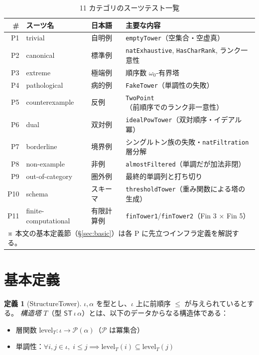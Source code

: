 \documentclass[a4paper,11pt]{ltjsarticle}
\theoremstyle{definition}
\newtheorem{definition}{定義}[section]
\theoremstyle{plain}
\theoremstyle{remark}
\newcommand{\ST}{\mathsf{ST}}    %
\newcommand{\lev}{\mathrm{level}}
\begin{document}
\begin{table}[H]
\centering
\caption{11 カテゴリのスーツテスト一覧}\label{tab:suit-categories}
\begin{tabular}{rlll}
\toprule
\# & スーツ名 & 日本語 & 主要な内容 \\
\midrule
P1  & trivial              & 自明例     & \texttt{emptyTower}（空集合・空虚真） \\
P2  & canonical            & 標準例     & \texttt{natExhaustive}, \texttt{HasCharRank}, ランク一意性 \\
P3  & extreme              & 極端例     & 順序数 $\omega_0$-有界塔 \\
P4  & pathological         & 病的例     & \texttt{FakeTower}（単調性の失敗） \\
P5  & counterexample       & 反例       & \texttt{TwoPoint}（前順序でのランク非一意性） \\
P6  & dual                 & 双対例     & \texttt{idealPowTower}（双対順序・イデアル冪） \\
P7  & borderline           & 境界例     & シングルトン族の失敗・\texttt{natFiltration} 層分解 \\
P8  & non-example          & 非例       & \texttt{almostFiltered}（単調だが加法非閉） \\
P9  & out-of-category      & 圏外例     & 最終的単調列と打ち切り \\
P10 & schema               & スキーマ   & \texttt{thresholdTower}（重み関数による塔の生成） \\
P11 & finite-computational & 有限計算例 & \texttt{finTower1}/\texttt{finTower2}（Fin 3 × Fin 5） \\
\bottomrule
\multicolumn{4}{l}{\small ※ 本文の基本定義節（§\ref{sec:basic}）は各 P に先立つインフラ定義を解説する。}
\end{tabular}
\end{table}

\section{基本定義}\label{sec:defs}

\begin{definition}[StructureTower]\label{def:structure-tower}
$\iota, \alpha$ を型とし、$\iota$ 上に前順序 $\leq$ が与えられているとする。
\emph{構造塔} $T$（型 $\ST\,\iota\,\alpha$）とは、以下のデータからなる構造体である：
\begin{itemize}
  \item 層関数 $\lev_T : \iota \to \mathcal{P}(\alpha)$（$\mathcal{P}$ は冪集合）
  \item 単調性：$\forall i, j \in \iota,\; i \leq j \implies \lev_T(i) \subseteq \lev_T(j)$
\end{itemize}
\end{definition}
\end{document}
